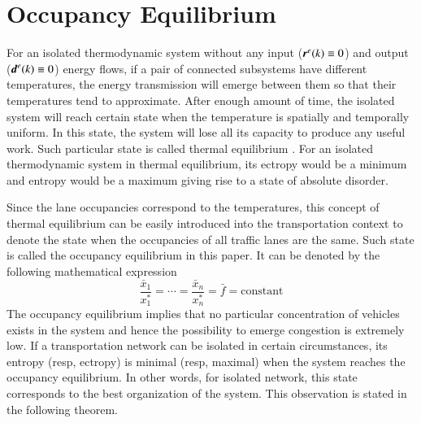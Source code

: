 \documentclass[preprint,authoryear,12pt]{elsarticle}
\renewcommand{\vec}[1]{\mbox{\boldmath$#1$}}
\begin{document}
\newpage

\section{Occupancy Equilibrium}\label{sec:equilibrium}

For an isolated thermodynamic system without any input
($\vec{r}^e(k)\equiv 0$) and output ($\vec{d}^e(k)\equiv 0$) energy
flows, if a pair of connected subsystems have different temperatures,
the energy transmission will emerge between them so that their
temperatures tend to approximate. After enough amount of time, the
isolated system will reach certain state when the temperature is
spatially and temporally uniform. In this state, the system will lose
all its capacity to produce any useful work. Such particular state is
called thermal equilibrium \citep{cengel_thermodynamics:_2001}. For
an isolated thermodynamic system in thermal equilibrium, its ectropy
would be a minimum and entropy would be a maximum giving rise to a
state of absolute disorder.

Since the lane occupancies correspond to the temperatures, this
concept of thermal equilibrium can be easily introduced into the
transportation context to denote the state when the occupancies of
all traffic lanes are the same. Such state is called the occupancy
equilibrium in this paper. It can be denoted by the following
mathematical expression
\begin{equation}\label{equ:equilibrium}
\frac{\bar{x}_1}{x_1^*}=\cdots=\frac{\bar{x}_n}{x_n^*}=\bar{f}=\text{constant}
\end{equation}
The occupancy equilibrium implies that no particular concentration of
vehicles exists in the system and hence the possibility to emerge
congestion is extremely low.
If a transportation network can be isolated in certain circumstances,
its entropy (resp, ectropy) is minimal (resp, maximal) when
the system reaches the occupancy equilibrium. In other words, for
isolated network, this state corresponds to the best organization of
the system. This observation is stated in the following theorem.
\end{document}
